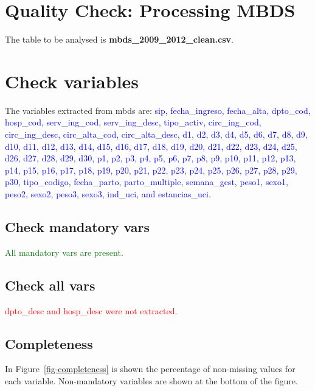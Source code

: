\documentclass[
  letterpaper,
  DIV=11,
  numbers=noendperiod]{scrreprt}
\begin{document}

\hypertarget{quality-check-processing-mbds}{%
\chapter{Quality Check: Processing
MBDS}\label{quality-check-processing-mbds}}

The table to be analysed is \textbf{mbds\_2009\_2012\_clean.csv}.


\hypertarget{check-variables}{%
\chapter{Check variables}\label{check-variables}}

The variables extracted from mbds are:
\textcolor{blue}{sip, fecha_ingreso, fecha_alta, dpto_cod, hosp_cod, serv_ing_cod, serv_ing_desc, tipo_activ, circ_ing_cod, circ_ing_desc, circ_alta_cod, circ_alta_desc, d1, d2, d3, d4, d5, d6, d7, d8, d9, d10, d11, d12, d13, d14, d15, d16, d17, d18, d19, d20, d21, d22, d23, d24, d25, d26, d27, d28, d29, d30, p1, p2, p3, p4, p5, p6, p7, p8, p9, p10, p11, p12, p13, p14, p15, p16, p17, p18, p19, p20, p21, p22, p23, p24, p25, p26, p27, p28, p29, p30, tipo_codigo, fecha_parto, parto_multiple, semana_gest, peso1, sexo1, peso2, sexo2, peso3, sexo3, ind_uci, and estancias_uci}.

\hypertarget{check-mandatory-vars}{%
\section{Check mandatory vars}\label{check-mandatory-vars}}

\textcolor{green}{All mandatory vars are present}.

\hypertarget{check-all-vars}{%
\section{Check all vars}\label{check-all-vars}}

\textcolor{red}{dpto_desc and hosp_desc were not extracted}.

\hypertarget{completeness}{%
\section{Completeness}\label{completeness}}

In Figure~\ref{fig-completeness} is shown the percentage of non-missing
values for each variable. Non-mandatory variables are shown at the
bottom of the figure.
\end{document}
